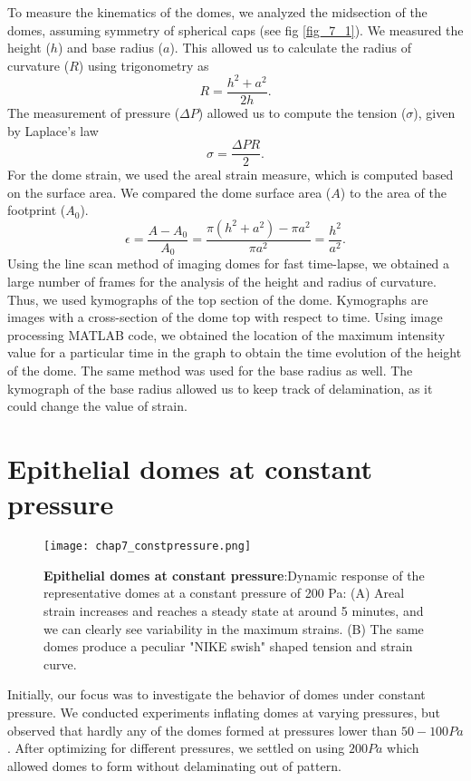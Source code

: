 To measure the kinematics of the domes, we analyzed the midsection of the domes, assuming symmetry of spherical caps (see fig \ref{fig_7_1}). We measured the height ($h$) and base radius ($a$). This allowed us to calculate the radius of curvature ($R$) using trigonometry as 
$$ R = \frac{h^2 + a^2}{2h}.$$ 
The measurement of pressure ($\Delta P$) allowed us to compute the tension ($\sigma$), given by Laplace's law 
$$\sigma = \frac{\Delta PR }{2} .$$
For the dome strain, we used the areal strain measure, which is computed based on the surface area. We compared the dome surface area ($A$) to the area of the footprint ($A_{0}$).
$$ \epsilon = \frac{A - A_{0}}{A_{0}} = \frac{\pi(h^2 + a^2) - \pi a^2}{\pi a^2} = \frac{h^2}{a^2} .$$
Using the line scan method of imaging domes for fast time-lapse, we obtained a large number of frames for the analysis of the height and radius of curvature. Thus, we used kymographs of the top section of the dome. Kymographs are images with a cross-section of the dome top with respect to time. Using image processing MATLAB code, we obtained the location of the maximum intensity value for a particular time in the graph to obtain the time evolution of the height of the dome. The same method was used for the base radius as well. The kymograph of the base radius allowed us to keep track of delamination, as it could change the value of strain.

\hypertarget{epithelial-domes-at-constant-pressure}{%
	\section{Epithelial domes at constant
		pressure}\label{epithelial-domes-at-constant-pressure}}


\begin{figure}
	\centering
	\texttt{[image: chap7\_constpressure.png]}
	\caption{\label{fig_7_3} \textbf{Epithelial domes at constant pressure}:Dynamic response of the representative domes at a constant pressure of 200 Pa: (A) Areal strain increases and reaches a steady state at around 5 minutes, and we can clearly see variability in the maximum strains. (B) The same domes produce a peculiar "NIKE swish" shaped tension and strain curve.
	}
\end{figure}

Initially, our focus was to investigate the behavior of domes under constant pressure. We conducted experiments inflating domes at varying pressures, but observed that hardly any of the domes formed at pressures lower than $50-100 Pa$. After optimizing for different pressures, we settled on using $200 Pa$ which allowed domes to form without delaminating out of pattern.

